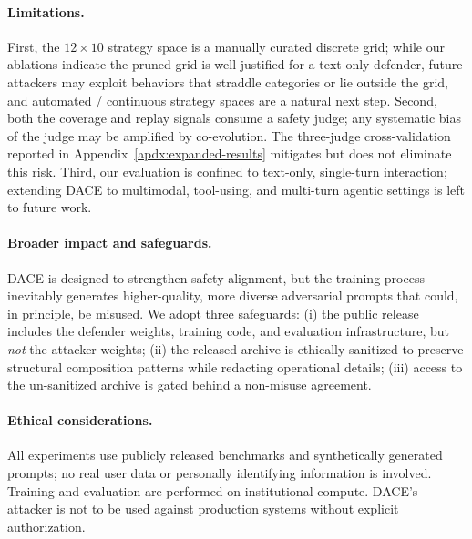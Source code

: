 \documentclass{article}
\newcommand{\method}{\textsc{DACE}\xspace}
\begin{document}
\paragraph{Limitations.}
First, the $12\times10$ strategy space is a manually curated discrete grid; while our ablations indicate the pruned grid is well-justified for a text-only defender, future attackers may exploit behaviors that straddle categories or lie outside the grid, and automated / continuous strategy spaces are a natural next step. Second, both the coverage and replay signals consume a safety judge; any systematic bias of the judge may be amplified by co-evolution. The three-judge cross-validation reported in Appendix~\ref{apdx:expanded-results} mitigates but does not eliminate this risk. Third, our evaluation is confined to text-only, single-turn interaction; extending \method to multimodal, tool-using, and multi-turn agentic settings is left to future work.

\paragraph{Broader impact and safeguards.}
\method is designed to strengthen safety alignment, but the training process inevitably generates higher-quality, more diverse adversarial prompts that could, in principle, be misused. We adopt three safeguards: (i) the public release includes the defender weights, training code, and evaluation infrastructure, but \emph{not} the attacker weights; (ii) the released archive is ethically sanitized to preserve structural composition patterns while redacting operational details; (iii) access to the un-sanitized archive is gated behind a non-misuse agreement.

\paragraph{Ethical considerations.}
All experiments use publicly released benchmarks and synthetically generated prompts; no real user data or personally identifying information is involved. Training and evaluation are performed on institutional compute. \method's attacker is not to be used against production systems without explicit authorization.




\end{document}
